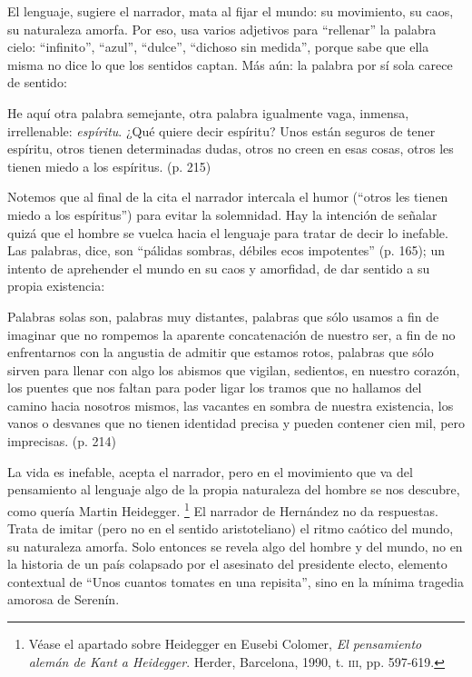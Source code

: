\documentclass[14pt,twoside,final]{extbook} %
\let\oldfootnote\footnote
\renewcommand\footnote[1]{%
\oldfootnote{\hspace{1mm}#1}}
\begin{document}
El lenguaje, sugiere el narrador, mata al fijar el mundo: su movimiento, su caos, su naturaleza amorfa. Por eso, usa varios adjetivos para ``rellenar'' la palabra cielo: ``infinito'', ``azul'', ``dulce'', ``dichoso sin medida'', porque sabe que ella misma no dice lo que los sentidos captan. Más aún: la palabra por sí sola carece de sentido:
\begin{quoting}
He aquí otra palabra semejante, otra palabra igualmente vaga, inmensa, irrellenable: \emph{espíritu}. ¿Qué quiere decir espíritu? Unos están seguros de tener espíritu, otros tienen determinadas dudas, otros no creen en esas cosas, otros les tienen miedo a los espíritus. (p. 215)
\end{quoting}
Notemos que al final de la cita el narrador intercala el humor (``otros les tienen miedo a los espíritus'') para evitar la solemnidad. Hay la intención de señalar quizá que el hombre se vuelca hacia el lenguaje para tratar de decir lo inefable. Las palabras, dice, son ``pálidas sombras, débiles ecos impotentes'' (p. 165); un intento de aprehender el mundo en su caos y amorfidad, de dar sentido a su propia existencia:
\begin{quoting}
Palabras solas son, palabras muy distantes, palabras que sólo usamos a fin de imaginar que no rompemos la aparente concatenación de nuestro ser, a fin de no enfrentarnos con la angustia de admitir que estamos rotos, palabras que sólo sirven para llenar con algo los abismos que vigilan, sedientos, en nuestro corazón, los puentes que nos faltan para poder ligar los tramos que no hallamos del camino hacia nosotros mismos, las vacantes en sombra de nuestra existencia, los vanos o desvanes que no tienen identidad precisa y pueden contener cien mil, pero imprecisas. (p. 214)
\end{quoting}
La vida es inefable, acepta el narrador, pero en el movimiento que va del pensamiento al lenguaje algo de la propia naturaleza del hombre se nos descubre, como quería Martin Heidegger.\footnote{Véase el apartado sobre Heidegger en Eusebi Colomer, \emph{El pensamiento alemán de Kant a Heidegger}. Herder, Barcelona, 1990, t. \textsc{iii}, pp. 597-619.} El narrador de Hernández no da respuestas. Trata de imitar (pero no en el sentido aristoteliano) el ritmo caótico del mundo, su naturaleza amorfa. Solo entonces se revela algo del hombre y del mundo, no en la historia de un país colapsado por el asesinato del presidente electo, elemento contextual de ``Unos cuantos tomates en una repisita'', sino en la mínima tragedia amorosa de Serenín.
\end{document}
